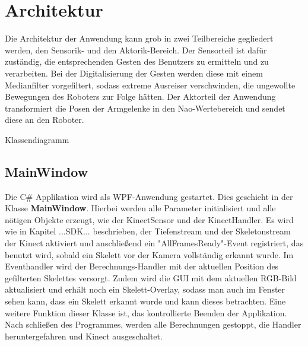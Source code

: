 %
%
\section{Architektur}\label{k:Architektur}
Die Architektur der Anwendung kann grob in zwei Teilbereiche gegliedert werden, den Sensorik- und den Aktorik-Bereich.
Der Sensorteil ist dafür zuständig, die entsprechenden Gesten des Benutzers zu ermitteln und zu verarbeiten. Bei der Digitalisierung der Gesten werden diese mit einem Medianfilter vorgefiltert, sodass extreme Ausreiser verschwinden, die ungewollte Bewegungen des Roboters zur Folge hätten.
Der Aktorteil der Anwendung transformiert die Posen der Armgelenke in den Nao-Wertebereich und sendet diese an den Roboter.

%
%
%

Klassendiagramm

\subsection{MainWindow}
Die C\# Applikation wird als WPF-Anwendung gestartet. Dies geschieht in der Klasse \textbf{MainWindow}. Hierbei werden alle Parameter initialisiert und alle nötigen Objekte erzeugt, wie der KinectSensor und der KinectHandler. Es wird wie in Kapitel ...SDK... beschrieben, der Tiefenstream und der Skeletonstream der Kinect aktiviert und anschließend ein "AllFramesReady"-Event registriert, das benutzt wird, sobald ein Skelett vor der Kamera vollständig erkannt wurde. Im Eventhandler wird der Berechnungs-Handler mit der aktuellen Position des gefilterten Skelettes versorgt. Zudem wird die GUI mit dem aktuellen RGB-Bild aktualisiert und erhält noch ein Skelett-Overlay, sodass man auch im Fenster sehen kann, dass ein Skelett erkannt wurde und kann dieses betrachten. Eine weitere Funktion dieser Klasse ist, das kontrollierte Beenden der Applikation. Nach schließen des Programmes, werden alle Berechnungen gestoppt, die Handler heruntergefahren und Kinect ausgeschaltet.



